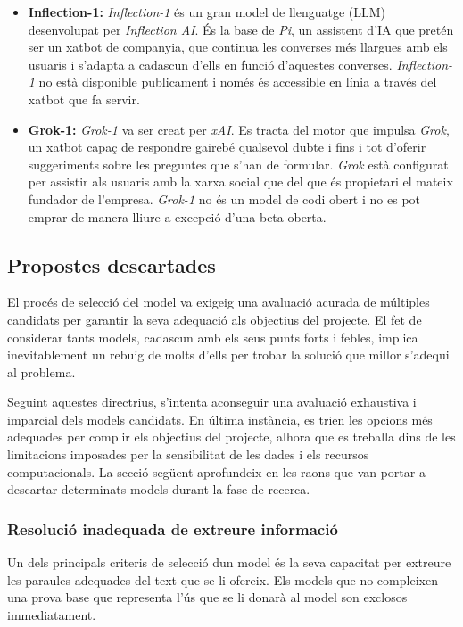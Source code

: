 \begin{itemize}
  \item \textbf{Inflection-1:} \textit{Inflection-1} és un gran model de llenguatge (LLM) desenvolupat per \textit{Inflection AI}. És la base de \textit{Pi}, un assistent d'IA que pretén ser un xatbot de companyia, que continua les converses més llargues amb els usuaris i s'adapta a cadascun d'ells en funció d'aquestes converses. \textit{Inflection-1} no està disponible publicament i només és accessible en línia a través del xatbot que fa servir.
  \item \textbf{Grok-1:} \textit{Grok-1} va ser creat per \textit{xAI}. Es tracta del motor que impulsa \textit{Grok}, un xatbot capaç de respondre gairebé qualsevol dubte i fins i tot d'oferir suggeriments sobre les preguntes que s'han de formular. \textit{Grok} està configurat per assistir als usuaris amb la xarxa social que del que és propietari el mateix fundador de l'empresa. \textit{Grok-1} no és un model de codi obert i no es pot emprar de manera lliure a excepció d'una beta oberta.
\end{itemize}

\subsection{Propostes descartades}
El procés de selecció del model va exigeig una avaluació acurada de múltiples candidats per garantir la seva adequació als objectius del projecte. El fet de considerar tants models, cadascun amb els seus punts forts i febles, implica inevitablement un rebuig de molts d'ells per trobar la solució que millor s'adequi al problema. 

Seguint aquestes directrius, s'intenta aconseguir una avaluació exhaustiva i imparcial dels models candidats. En última instància, es trien les opcions més adequades per complir els objectius del projecte, alhora que es treballa dins de les limitacions imposades per la sensibilitat de les dades i els recursos computacionals. La secció següent aprofundeix en les raons que van portar a descartar determinats models durant la fase de recerca.

\subsubsection{Resolució inadequada de extreure informació}
Un dels principals criteris de selecció dun model és la seva capacitat per extreure les paraules adequades del text que se li ofereix. Els models que no compleixen una prova base que representa l'ús que se li donarà al model son exclosos immediatament. 

